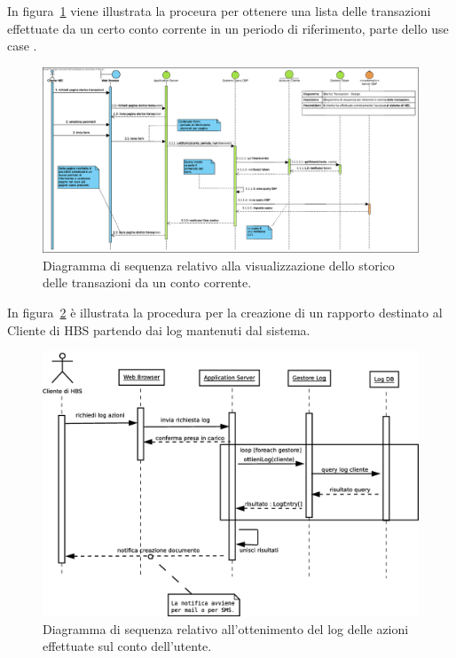 In figura~\ref{fig:sequenza:storico} viene illustrata la proceura per ottenere una lista delle transazioni effettuate da un certo conto corrente in un periodo di riferimento, parte dello use case \iducVERSTOR.

\begin{figure}[h]
    \centering
	\includegraphics[width=\textheight, angle=90]{Images/Storico_Transazioni_-_Design.eps}
    \caption{Diagramma di sequenza relativo alla visualizzazione dello storico delle transazioni da un conto corrente.}
    \label{fig:sequenza:storico}
\end{figure}

In figura~\ref{fig:sequenza:log} \`e illustrata la procedura per la creazione di un rapporto destinato al Cliente di HBS partendo dai log mantenuti dal sistema.

\begin{figure}[h]
    \centering
	\includegraphics[height=\textwidth, angle=90]{Images/dia/Logging-Sequence.eps}
    \caption{Diagramma di sequenza relativo all'ottenimento del log delle azioni effettuate sul conto dell'utente.}
    \label{fig:sequenza:log}
\end{figure}


